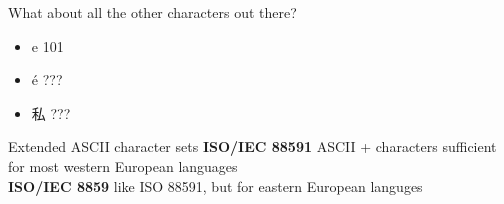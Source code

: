 \documentclass[../index.tex]{subfiles}
\begin{document}
\renewcommand{\currenttitle}{What about all the other characters out there?}
\newcommand{\nonasciiitem}[2][???]{\item[] #2 \textrightarrow{} #1}
\begin{frame}{\currenttitle}
%
%
  \begin{itemize}[leftmargin=*]
    \nonasciiitem[101]{e}
    \nonasciiitem{é}
    \nonasciiitem{私}
  \end{itemize}
\end{frame}

\renewcommand{\currenttitle}{Extended ASCII character sets}
\begin{frame}{\currenttitle}
  \textbf{ISO/IEC 8859\textendash{}1} \textendash{}
    ASCII + characters sufficient for most western European languages \\
  \textbf{ISO/IEC 8859} \textendash{}
    like ISO 8859\textendash{}1, but for eastern European languges \\
\end{frame}

\end{document}
